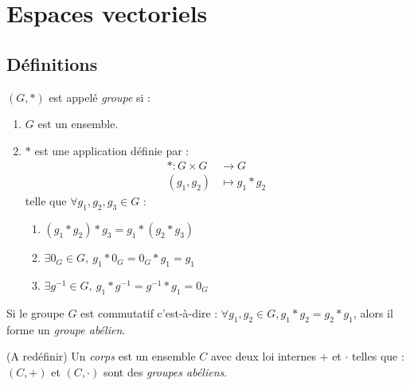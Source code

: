 \chapter{Espaces vectoriels}\label{chap:espaces_vectoriels}

\section{Définitions}
\begin{definition}[Groupe]
    $(G, *)$ est appelé \emph{groupe} si :
    \begin{enumerate}
        \item $G$ est un ensemble.
        \item \og $*$ \fg est une application définie par :
        \begin{align*}
            * : G \times G &\to G \\
            (g_1, g_2) &\mapsto g_1 * g_2
        \end{align*}
        telle que $\forall g_1, g_2, g_3 \in G$ :
        \begin{multicols}{2}
            \begin{enumerate}
                \item $(g_1 * g_2) * g_3 = g_1 * (g_2 * g_3)$
                \item $\exists 0_G \in G,\ g_1 * 0_G = 0_G * g_1 = g_1$
                \item $\exists g^{-1} \in G,\ g_1 * g^{-1} = g^{-1} * g_1 = 0_G$
            \end{enumerate}
        \end{multicols}
    \end{enumerate}
\end{definition}

\par Si le groupe $G$ est commutatif c'est-à-dire : $\forall g_1, g_2 \in G, g_1 * g_2 = g_2 * g_1$, alors il forme un \emph{groupe abélien}.

\begin{definition}[Corps] %
    (A redéfinir)
    Un \emph{corps} est un ensemble $C$ avec deux loi internes \og $+$ \fg et \og $\cdot$ \fg telles que :
    $(C, +)$ et $(C, \cdot)$ sont des \emph{groupes abéliens}.
\end{definition}

